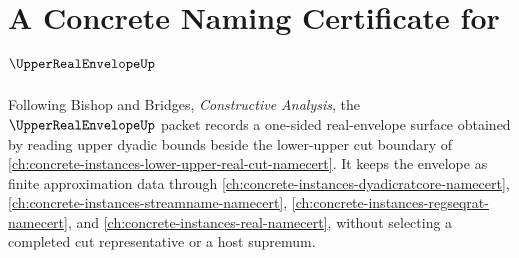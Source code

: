 \chapter{A Concrete Naming Certificate for $\UpperRealEnvelopeUp$}
\label{ch:concrete-instances-upper-real-envelope-namecert}

Following Bishop and Bridges, \emph{Constructive Analysis}, the $\UpperRealEnvelopeUp$ packet records a one-sided real-envelope surface obtained by reading upper dyadic bounds beside the lower-upper cut boundary of \autoref{ch:concrete-instances-lower-upper-real-cut-namecert}. It keeps the envelope as finite approximation data through \autoref{ch:concrete-instances-dyadicratcore-namecert}, \autoref{ch:concrete-instances-streamname-namecert}, \autoref{ch:concrete-instances-regseqrat-namecert}, and \autoref{ch:concrete-instances-real-namecert}, without selecting a completed cut representative or a host supremum.

